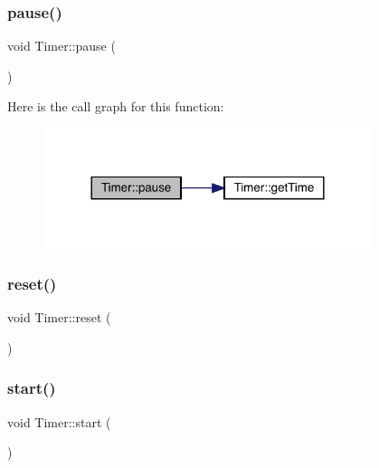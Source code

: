 \subsubsection{\texorpdfstring{pause()}{pause()}}
{\footnotesize\ttfamily void Timer\+::pause (\begin{DoxyParamCaption}{ }\end{DoxyParamCaption})\hspace{0.3cm}{\ttfamily [inline]}}

Here is the call graph for this function\+:
\nopagebreak
\begin{figure}[H]
\begin{center}
\leavevmode
\includegraphics[width=272pt]{class_timer_a0289effad7b573c508bc27e405900a23_cgraph}
\end{center}
\end{figure}
\mbox{\label{class_timer_a9020542d73357a4eef512eefaf57524b}} 
\subsubsection{\texorpdfstring{reset()}{reset()}}
{\footnotesize\ttfamily void Timer\+::reset (\begin{DoxyParamCaption}{ }\end{DoxyParamCaption})\hspace{0.3cm}{\ttfamily [inline]}}

\mbox{\label{class_timer_a3a8b5272198d029779dc9302a54305a8}} 
\subsubsection{\texorpdfstring{start()}{start()}}
{\footnotesize\ttfamily void Timer\+::start (\begin{DoxyParamCaption}{ }\end{DoxyParamCaption})\hspace{0.3cm}{\ttfamily [inline]}}

